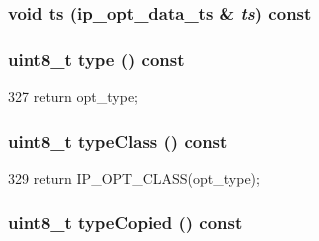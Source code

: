 \label{structNet_1_1IpOpt_ace178303b38d98788c16c141f3b55971}
\hypertarget{structNet_1_1IpOpt_ac94e6af869d0dc5da39d06906a4951ae}{
\subsubsection[{ts}]{\setlength{\rightskip}{0pt plus 5cm}void ts (ip\_\-opt\_\-data\_\-ts \& {\em ts}) const}}
\label{structNet_1_1IpOpt_ac94e6af869d0dc5da39d06906a4951ae}
\hypertarget{structNet_1_1IpOpt_a7c3e8c8aa22970484617493a084000b9}{
\subsubsection[{type}]{\setlength{\rightskip}{0pt plus 5cm}uint8\_\-t type () const}}
\label{structNet_1_1IpOpt_a7c3e8c8aa22970484617493a084000b9}



\begin{DoxyCode}
327 { return opt_type; }
\end{DoxyCode}
\hypertarget{structNet_1_1IpOpt_af0f70ac78a76faa3fe76ccd7bf90acf5}{
\subsubsection[{typeClass}]{\setlength{\rightskip}{0pt plus 5cm}uint8\_\-t typeClass () const}}
\label{structNet_1_1IpOpt_af0f70ac78a76faa3fe76ccd7bf90acf5}



\begin{DoxyCode}
329 { return IP_OPT_CLASS(opt_type); }
\end{DoxyCode}
\hypertarget{structNet_1_1IpOpt_a582d9edfaa08e08e2c34dc79575c42bb}{
\subsubsection[{typeCopied}]{\setlength{\rightskip}{0pt plus 5cm}uint8\_\-t typeCopied () const}}
\label{structNet_1_1IpOpt_a582d9edfaa08e08e2c34dc79575c42bb}



